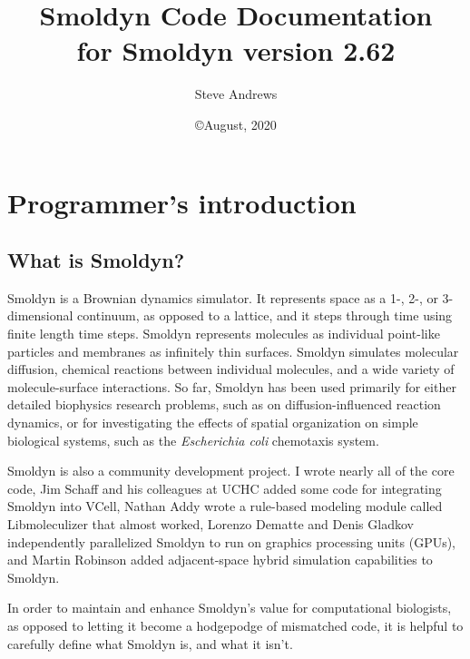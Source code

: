 \documentclass {book}
\begin{document}



\title{\textbf{Smoldyn Code Documentation} \\ \large for Smoldyn version 2.62}
\date{\copyright August, 2020}
\author{Steve Andrews}
\maketitle

\tableofcontents


\chapter{Programmer's introduction}

\section{What is Smoldyn?}

Smoldyn is a Brownian dynamics simulator. It represents space as a 1-, 2-, or 3-dimensional continuum, as opposed to a lattice, and it steps through time using finite length time steps. Smoldyn represents molecules as individual point-like particles and membranes as infinitely thin surfaces. Smoldyn simulates molecular diffusion, chemical reactions between individual molecules, and a wide variety of molecule-surface interactions. So far, Smoldyn has been used primarily for either detailed biophysics research problems, such as on diffusion-influenced reaction dynamics, or for investigating the effects of spatial organization on simple biological systems, such as the \emph{Escherichia coli} chemotaxis system.

Smoldyn is also a community development project. I wrote nearly all of the core code, Jim Schaff and his colleagues at UCHC added some code for integrating Smoldyn into VCell, Nathan Addy wrote a rule-based modeling module called Libmoleculizer that almost worked, Lorenzo Dematte and Denis Gladkov independently parallelized Smoldyn to run on graphics processing units (GPUs), and Martin Robinson added adjacent-space hybrid simulation capabilities to Smoldyn.

In order to maintain and enhance Smoldyn's value for computational biologists, as opposed to letting it become a hodgepodge of mismatched code, it is helpful to carefully define what Smoldyn is, and what it isn't.
\end{document}
